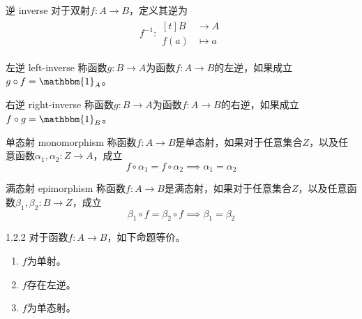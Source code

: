 \documentclass[lang = cn, scheme = chinese, thmcnt = section]{elegantbook}
\begin{document}
\begin{definition}{逆 inverse}
	对于双射$f:A\to B$，定义其逆为
	\begin{align*}
		f^{-1}:\begin{aligned}[t]
			B&\longrightarrow A\\
			f(a)&\longmapsto a
		\end{aligned}
	\end{align*}
\end{definition}

\begin{definition}{左逆 left-inverse}
	称函数$g:B\to A$为函数$f:A\to B$的左逆，如果成立$g\circ f=\mathbbm{1}_A$。
\end{definition}

\begin{definition}{右逆 right-inverse}
	称函数$g:B\to A$为函数$f:A\to B$的右逆，如果成立$f\circ g=\mathbbm{1}_B$。
\end{definition}

\begin{definition}{单态射 monomorphism}
	称函数$f:A\to B$是单态射，如果对于任意集合$Z$，以及任意函数$\alpha_1,\alpha_2:Z\to A$，成立
	$$
	f\circ \alpha_1=f\circ \alpha_2\implies\alpha_1=\alpha_2
	$$
\end{definition}

\begin{definition}{满态射 epimorphism}
	称函数$f:A\to B$是满态射，如果对于任意集合$Z$，以及任意函数$\beta_1,\beta_2:B\to Z$，成立
	$$
	\beta_1\circ f=\beta_2\circ f\implies \beta_1=\beta_2
	$$
\end{definition}

\begin{theorem}{}{1.2.2}
	对于函数$f:A\to B$，如下命题等价。
	\begin{enumerate}
		\item $f$为单射。
		\item $f$存在左逆。
		\item $f$为单态射。
	\end{enumerate}
\end{theorem}
\end{document}
